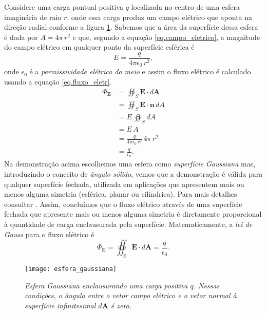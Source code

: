 Considere uma carga pontual positiva $q$ localizada no centro de uma esfera imaginária de raio $r$, onde essa carga produz um campo elétrico que aponta na direção radial conforme a figura \ref{fig.esfe_gauss}. Sabemos que a área da superfície dessa esfera é dada por $A=4\pi\,r^2$ e que, segundo a equação \ref{eq.campo_eletrico}, a magnitude do campo elétrico em qualquer ponto da superfície esférica é
\begin{equation*}
E=\frac{q}{4\pi\epsilon_0\,r^2},
\end{equation*}
onde $\epsilon_0$ \'e a \textit{permissividade el\'etrica do meio} e assim o fluxo elétrico é calculado usando a equação \ref{eq.fluxo_eletr}.
\begin{align*}
\Phi_\textbf{E}&=\oiint_S\textbf{E}\cdot\textit{d}\textbf{A}\\
&=\oiint_S\textbf{E}\cdot\textbf{n}\,\textit{d}A\\
&=E\,\oiint_S\textit{d}A\\
&=E\,A\\
&=\frac{q}{4\pi\epsilon_0\,r^2}\,4\pi\,r^2\\
&=\frac{q}{\epsilon_0}.
\end{align*}
Na demonstração acima escolhemos uma esfera como \textit{superfície Gaussiana} mas, introduzindo o conceito de \textit{ângulo sólido}, vemos que a demonstração é válida para qualquer superfície fechada, utilizada em aplicações que apresentem mais ou menos alguma simetria (esférica, planar ou cilíndrica). Para mais detalhes consultar \cite{jackson_classical_1999}. Assim, concluímos que o fluxo elétrico através de uma superfície fechada que apresente mais ou menos alguma simetria é diretamente proporcional à quantidade de carga enclausurada pela superfície. Matematicamente, a \textit{lei de Gauss} para o fluxo elétrico é
\begin{equation}\label{eq.fluxo_eletrico}
\Phi_\textbf{E}=\oiint_S\textbf{E}\cdot\textit{d}\textbf{A}=\frac{q}{\epsilon_0}.
\end{equation}
\begin{figure}[!htb]
\centering
\texttt{[image: esfera\_gaussiana]}
\caption{\textit{Esfera Gaussiana enclausurando uma carga positiva $q$. Nessas condições, o ângulo entre o vetor campo elétrico e o vetor normal à superfície infinitesimal $d\textbf{A}$ é zero.}}
\label{fig.esfe_gauss}
\end{figure}

